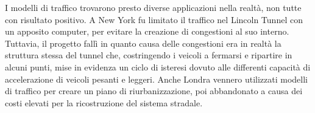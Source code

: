 I modelli di traffico trovarono presto diverse applicazioni nella realt\`a, non tutte con risultato positivo.
A New York fu limitato il traffico nel Lincoln Tunnel con un apposito computer, per evitare la creazione di congestioni al suo interno.
Tuttavia, il progetto fall\`i in quanto causa delle congestioni era in realt\`a la struttura stessa del tunnel che, costringendo i veicoli a fermarsi e ripartire in alcuni punti, mise in evidenza un ciclo di isteresi dovuto alle differenti capacit\`a di accelerazione di veicoli pesanti e leggeri.
Anche Londra vennero utilizzati modelli di traffico per creare un piano di riurbanizzazione, poi abbandonato a causa dei costi elevati per la ricostruzione del sistema stradale.